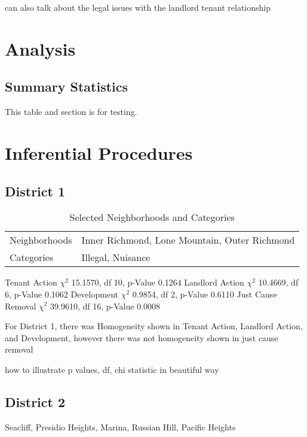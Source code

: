\documentclass[]{article}
\begin{document}
can also talk about the legal issues with the landlord tenant relationship
\section{Analysis}
\subsection{Summary Statistics}
This table and section is for testing.

\section{Inferential Procedures}
\subsection{District 1}
\begin{table}[h]
\centering
\begin{tabular}{|l | l|}
Neighborhoods & Inner Richmond, Lone Mountain, Outer Richmond \\
Categories    & Illegal, Nuisance 							  \\
\end{tabular}
\caption{Selected Neighborhoods and Categories}
\end{table}
\FloatBarrier

Tenant Action\newline
$\chi ^{2}$ 15.1570, df 10, p-Value 0.1264\newline
Landlord Action\newline
$\chi ^{2}$ 10.4669, df 6, p-Value 0.1062\newline
Development\newline
$\chi ^{2}$ 0.9854, df 2, p-Value 0.6110\newline
Just Cause Removal\newline
$\chi ^{2}$ 39.9610, df 16, p-Value 0.0008\newline


For District 1, there was Homogeneity shown in Tenant Action, Landlord Action, and Development, however there was not homogeneity shown in just cause removal

how to illustrate p values, df, chi statistic in beautiful way

\subsection{District 2}
Seacliff, Presidio Heights, Marina, Russian Hill, Pacific Heights
\end{document}
